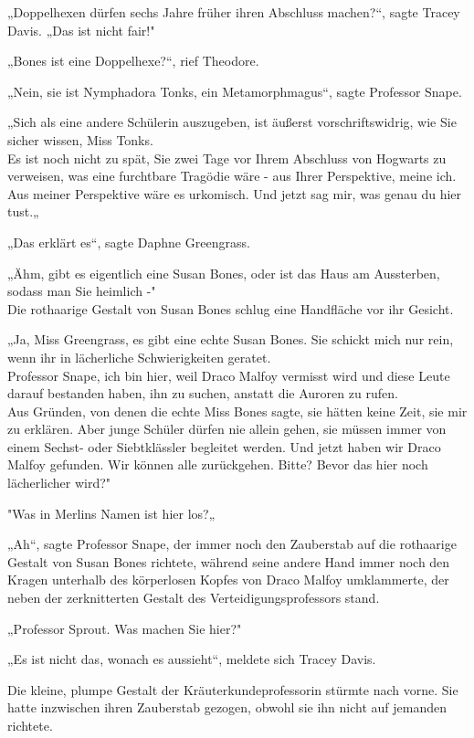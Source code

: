 {„Doppelhexen dürfen sechs Jahre früher ihren Abschluss machen?“, sagte Tracey Davis. „Das ist nicht fair!"

„Bones ist eine Doppelhexe?“, rief Theodore.

„Nein, sie ist Nymphadora Tonks, ein Metamorphmagus“, sagte Professor Snape.

„Sich als eine andere Schülerin auszugeben, ist äußerst vorschriftswidrig, wie Sie sicher wissen, Miss Tonks.\\ Es ist noch nicht zu spät, Sie zwei Tage vor Ihrem Abschluss von Hogwarts zu verweisen, was eine furchtbare Tragödie wäre - aus Ihrer Perspektive, meine ich.\\ Aus meiner Perspektive wäre es urkomisch. Und jetzt sag mir, was genau du hier tust.„

„Das erklärt es“, sagte Daphne Greengrass.

„Ähm, gibt es eigentlich eine Susan Bones, oder ist das Haus am Aussterben, sodass man Sie heimlich -"\\ Die rothaarige Gestalt von Susan Bones schlug eine Handfläche vor ihr Gesicht.

„Ja, Miss Greengrass, es gibt eine echte Susan Bones. Sie schickt mich nur rein, wenn ihr in lächerliche Schwierigkeiten geratet.\\ Professor Snape, ich bin hier, weil Draco Malfoy vermisst wird und diese Leute darauf bestanden haben, ihn zu suchen, anstatt die Auroren zu rufen.\\ Aus Gründen, von denen die echte Miss Bones sagte, sie hätten keine Zeit, sie mir zu erklären. Aber junge Schüler dürfen nie allein gehen, sie müssen immer von einem Sechst- oder Siebtklässler begleitet werden. Und jetzt haben wir Draco Malfoy gefunden. Wir können alle zurückgehen. Bitte? Bevor das hier noch lächerlicher wird?"

"Was in Merlins Namen ist hier los?„

„Ah“, sagte Professor Snape, der immer noch den Zauberstab auf die rothaarige Gestalt von Susan Bones richtete, während seine andere Hand immer noch den Kragen unterhalb des körperlosen Kopfes von Draco Malfoy umklammerte, der neben der zerknitterten Gestalt des Verteidigungsprofessors stand.

„Professor Sprout. Was machen Sie hier?"

„Es ist nicht das, wonach es aussieht“, meldete sich Tracey Davis.

Die kleine, plumpe Gestalt der Kräuterkundeprofessorin stürmte nach vorne. Sie hatte inzwischen ihren Zauberstab gezogen, obwohl sie ihn nicht auf jemanden richtete.

}
